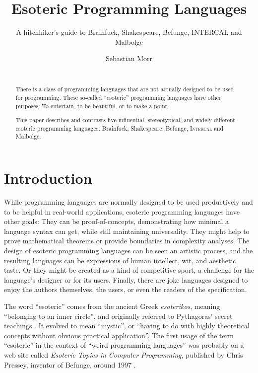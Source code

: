 \documentclass{sig-alternate}
\title{Esoteric Programming Languages}
\subtitle{A hitchhiker's guide to Brainfuck, Shakespeare, Befunge, INTERCAL and Malbolge}
\author{\alignauthor Sebastian Morr\\\affaddr{Technical University Braunschweig}\\\email{sebastian@morr.cc}}
\newcommand{\ic}{\textsc{Intercal}}
\begin{document}
\maketitle

\begin{abstract}
    There is a class of programming languages that are not actually designed to be used for programming. These so-called “esoteric” programming languages have other purposes: To entertain, to be beautiful, or to make a point.

    This paper describes and contrasts five influential, stereotypical, and widely different esoteric programming languages: Brainfuck, Shakespeare, Befunge, \ic{} and Malbolge.
\end{abstract}

\section{Introduction}
\label{introduction}

While programming languages are normally designed to be used productively and to be helpful in real-world applications, esoteric programming languages have other goals: They can be proof-of-concepts, demonstrating how minimal a language syntax can get, while still maintaining universality. They might help to prove mathematical theorems or provide boundaries in complexity analyses. The design of esoteric programming languages can be seen an artistic process, and the resulting languages can be expressions of human intellect, wit, and aesthetic taste. Or they might be created as a kind of competitive sport, a challenge for the language's designer or for its users. Finally, there are joke languages designed to enjoy the authors themselves, the users, or even the readers of the specification.

The word “esoteric” comes from the ancient Greek \emph{esoterikos}, meaning “belonging to an inner circle”, and originally referred to Pythagoras' secret teachings \cite{harper2014esoteric}. It evolved to mean “mystic”, or “having to do with highly theoretical concepts without obvious practical application”. The first usage of the term “esoteric” in the context of “weird programming languages” was probably on a web site called \emph{Esoteric Topics in Computer Programming}, published by Chris Pressey, inventor of Befunge, around 1997 \cite{pressey2005chris}.
\end{document}
